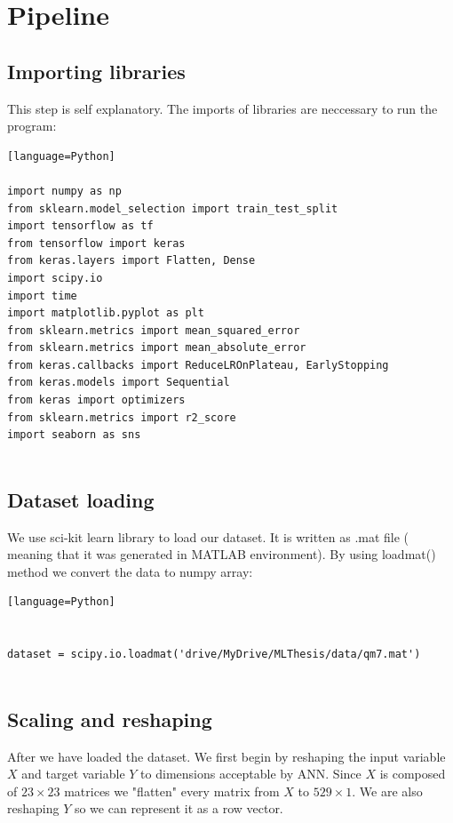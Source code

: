 \documentclass[a4paper,oneside,openright,11pt]{book}
\begin{document}
\section{Pipeline}

\subsection{Importing libraries}

This step is self explanatory. The imports of libraries are neccessary to run the program:

\begin{verbatim}[language=Python]

import numpy as np
from sklearn.model_selection import train_test_split
import tensorflow as tf
from tensorflow import keras
from keras.layers import Flatten, Dense
import scipy.io
import time
import matplotlib.pyplot as plt
from sklearn.metrics import mean_squared_error
from sklearn.metrics import mean_absolute_error
from keras.callbacks import ReduceLROnPlateau, EarlyStopping
from keras.models import Sequential
from keras import optimizers
from sklearn.metrics import r2_score
import seaborn as sns


\end{verbatim}


\subsection{Dataset loading}

We use sci-kit learn library to load our dataset. It is written as .mat file ( meaning that it was generated in MATLAB environment). By using loadmat() method we convert the data to numpy array:

\begin{verbatim}[language=Python]


dataset = scipy.io.loadmat('drive/MyDrive/MLThesis/data/qm7.mat')


\end{verbatim}

\subsection{Scaling and reshaping}

After we have loaded the dataset. We first begin by reshaping the input variable $X$ and target variable $Y$ to dimensions acceptable by ANN. Since $X$ is composed of  $23 \times 23$ matrices we "flatten" every matrix from $X$ to $529 \times 1$. We are also reshaping $Y$ so we can represent it as a row vector.
\end{document}
